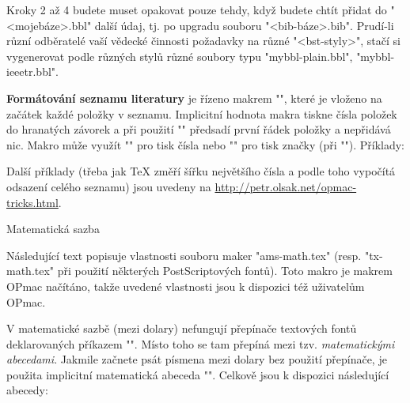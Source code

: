 Kroky 2 až 4 budete muset opakovat pouze tehdy, když budete chtít přidat do
"<mojebáze>.bbl" další údaj, tj. po upgradu souboru "<bib-báze>.bib". 
Prudí-li různí odběratelé vaší vědecké činnosti požadavky na různé 
"<bst-styly>", stačí si vygenerovat
podle různých stylů různé soubory typu "mybbl-plain.bbl",
"mybbl-ieeetr.bbl".

\medskip
\noindent 
{\bf Formátování seznamu literatury} je řízeno makrem "\printbib",
které je vloženo na začátek každé položky v seznamu. 
Implicitní hodnota makra tiskne čísla položek do
hranatých závorek a při použití "\nonumcitations" předsadí první řádek
položky a nepřidává nic. Makro může využít "\the\bibnum" pro tisk 
čísla nebo "\the\bibmark" pro tisk značky (při "\nonumcitations").
Příklady:

\begtt
\def\printbib{\hangindent=\parindent \indent \llap{\the\bibnum. }}

\def\printbib{\hangindent=\parindent \noindent [\the\bibmark]\quad}
\endtt

Další příklady (třeba jak \TeX{} změří šířku největšího čísla a podle toho
vypočítá odsazení celého seznamu) jsou uvedeny na
\url{http://petr.olsak.net/opmac-tricks.html}.

\sec Matematická sazba

Následující text popisuje vlastnosti souboru maker "ams-math.tex" (resp.
"tx-math.tex" při použití některých PostScriptových fontů). Toto makro je
makrem OPmac načítáno, takže uvedené vlastnosti jsou k dispozici též
uživatelům OPmac.

V matematické sazbě (mezi dolary) nefungují přepínače textových fontů
deklarovaných příkazem "\font". Místo toho se tam přepíná mezi tzv. {\it
matematickými abecedami}. Jakmile začnete psát písmena
mezi dolary bez použití přepínače, je použita implicitní matematická abeceda
"\mit". Celkově jsou k dispozici následující abecedy:

{\def\tthook{\catcode`\$=3 \catcode`/=0 \medmuskip=0mu}%
\begtt
\mit     %
\it      %
\rm      %
\cal     %
\script  %
\frak    %
\bbchar  %
\bf      %
\bi      %
\endtt
}

